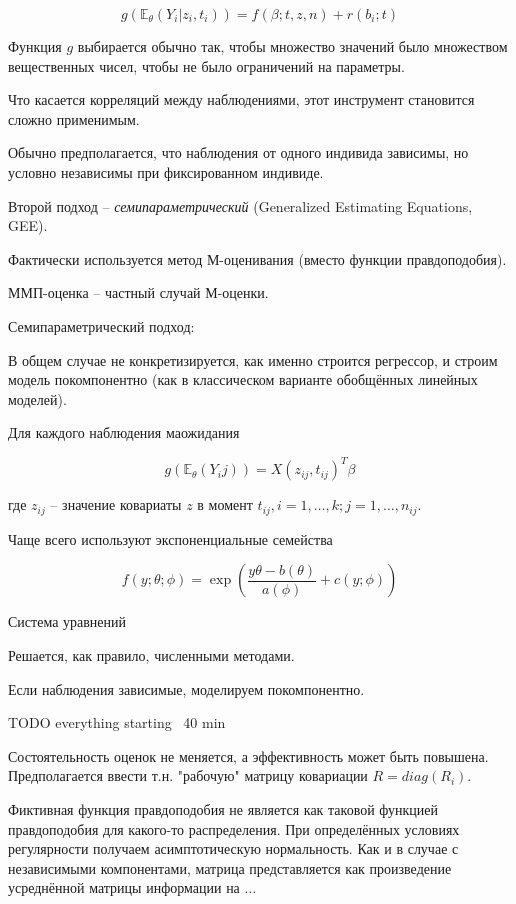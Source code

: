 \documentclass[main.tex]{subfiles}
\begin{document}
\[ g(\mathds{E}_\theta(Y_i | z_i, t_i)) = f(\beta; t, z, n) + r(b_i; t)  \]

Функция $ g $ выбирается обычно так, чтобы множество значений было множеством вещественных чисел, чтобы не было ограничений на параметры.

Что касается корреляций между наблюдениями, этот инструмент становится сложно применимым.

Обычно предполагается, что наблюдения от одного индивида зависимы, но условно независимы при фиксированном индивиде.


Второй подход -- \emph{семипараметрический} (Generalized Estimating Equations, GEE).

Фактически используется метод М-оценивания (вместо функции правдоподобия).
\begin{leftbar}
	ММП-оценка -- частный случай М-оценки.
\end{leftbar}

Семипараметрический подход:

В общем случае не конкретизируется, как именно строится регрессор, и строим модель покомпонентно (как в классическом варианте обобщённых линейных моделей).

Для каждого наблюдения маожидания

\[ g(\mathds E_\theta(Y_ij)) = X(z_{ij}, t_{ij})^T \beta \]

где  $ z_{ij} $ -- значение ковариаты $z$ в момент $ t_{ij}, i = 1, \dots, k; j = 1, \dots, n_{ij} $.

Чаще всего используют экспоненциальные семейства

\[ f(y; \theta; \phi) = \exp \left( \frac{y \theta - b(\theta)}{a(\phi)} + c(y; \phi) \right) \]

Система уравнений %

Решается, как правило, численными методами.

Если наблюдения зависимые, моделируем покомпонентно.

TODO everything starting ~40 min

Состоятельность оценок не меняется, а эффективность может быть повышена.
Предполагается ввести т.н. "рабочую" матрицу ковариации $ R = diag(R_i) $.

Фиктивная функция правдоподобия не является как таковой функцией правдоподобия для какого-то распределения.
При определённых условиях регулярности получаем асимптотическую нормальность.
Как и в случае с независимыми компонентами, матрица представляется как произведение усреднённой матрицы информации на $ \dots $
\end{document}

